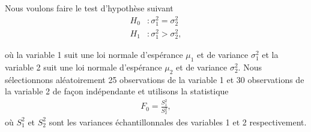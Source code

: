 \begin{questions}
\newpage 

\question\label{test2variances}
Nous voulons faire le test d'hypothèse suivant 
\begin{align*}
H_0 &:\sigma_1^2 = \sigma_2^2\\
H_1 &:\sigma_1^2 > \sigma_2^2,
\end{align*}

où la variable 1 suit une loi normale d'espérance $\mu_1$ et de variance $\sigma_1^2$ et la variable 2 suit une loi normale d'espérance $\mu_2$ et de variance $\sigma_2^2$. Nous sélectionnons aléatoirement 25 observations de la variable 1 et 30 observations de la variable 2 de façon indépendante et utilisons la statistique 
\begin{align*}
    F_0=\frac{S_1^2}{S_2^2},
\end{align*}
où $S_1^2$ et $S_2^2$ sont les variances échantillonnales des variables 1 et 2 respectivement.

\medskip
{}



\end{questions}
